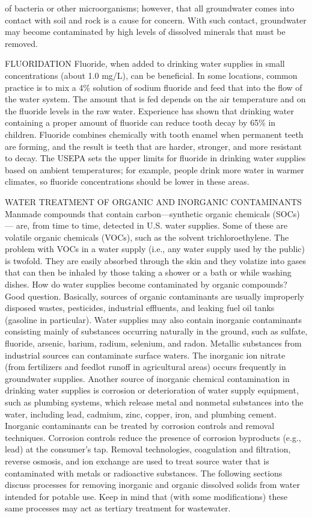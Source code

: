 \documentclass{article}
\begin{document}
of bacteria or other microorganisms; however, that all groundwater comes
into contact with soil and rock is a cause for concern. With such
contact, groundwater may become contaminated by high levels of dissolved
minerals that must be removed.

FLUORIDATION Fluoride, when added to drinking water supplies in small
concentrations (about 1.0 mg/L), can be beneficial. In some locations,
common practice is to mix a 4\% solution of sodium fluoride and feed
that into the flow of the water system. The amount that is fed depends
on the air temperature and on the fluoride levels in the raw water.
Experience has shown that drinking water containing a proper amount of
fluoride can reduce tooth decay by 65\% in children. Fluoride combines
chemically with tooth enamel when permanent teeth are forming, and the
result is teeth that are harder, stronger, and more resistant to decay.
The USEPA sets the upper limits for fluoride in drinking water supplies
based on ambient temperatures; for example, people drink more water in
warmer climates, so fluoride concentrations should be lower in these
areas.

WATER TREATMENT OF ORGANIC AND INORGANIC CONTAMINANTS Manmade compounds
that contain carbon---synthetic organic chemicals (SOCs)--- are, from
time to time, detected in U.S. water supplies. Some of these are
volatile organic chemicals (VOCs), such as the solvent
trichloroethylene. The problem with VOCs in a water supply (i.e., any
water supply used by the public) is twofold. They are easily absorbed
through the skin and they volatize into gases that can then be inhaled
by those taking a shower or a bath or while washing dishes. How do water
supplies become contaminated by organic compounds? Good question.
Basically, sources of organic contaminants are usually improperly
disposed wastes, pesticides, industrial effluents, and leaking fuel oil
tanks (gasoline in particular). Water supplies may also contain
inorganic contaminants consisting mainly of substances occurring
naturally in the ground, such as sulfate, fluoride, arsenic, barium,
radium, selenium, and radon. Metallic substances from industrial sources
can contaminate surface waters. The inorganic ion nitrate (from
fertilizers and feedlot runoff in agricultural areas) occurs frequently
in groundwater supplies. Another source of inorganic chemical
contamination in drinking water supplies is corrosion or deterioration
of water supply equipment, such as plumbing systems, which release metal
and nonmetal substances into the water, including lead, cadmium, zinc,
copper, iron, and plumbing cement. Inorganic contaminants can be treated
by corrosion controls and removal techniques. Corrosion controls reduce
the presence of corrosion byproducts (e.g., lead) at the consumer's tap.
Removal technologies, coagulation and filtration, reverse osmosis, and
ion exchange are used to treat source water that is contaminated with
metals or radioactive substances. The following sections discuss
processes for removing inorganic and organic dissolved solids from water
intended for potable use. Keep in mind that (with some modifications)
these same processes may act as tertiary treatment for wastewater.
\end{document}
